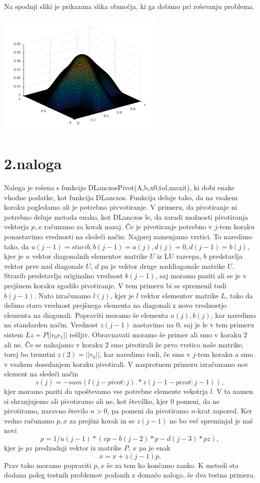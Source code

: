 \documentclass[11pt]{article} %
\begin{document}
Na spodnji sliki je prikazana slika območja, ki ga dobimo pri reševanju problema.

\includegraphics[width=0.6\textwidth]{slika1}

\section{2.naloga}

Naloga je rešena s funkcijo DLanczosPivot(A,b,x0,tol,maxit), ki dobi enake vhodne podatke, kot funkcija DLanczos. Funkcija deluje tako, da na vsakem koraku pogledamo ali je potrebno pivvotiranje. V primeru, da pivotiranje ni potrebno deluje metoda enako, kot DLanczos le, da zaradi možnosti pivotiranja vektorja $p,x$ računamo za korak nazaj. Če je pivotiranje potrebno v $j$-tem koraku ponastavimo vrednosti  na sledeči način:
Najprej zamenjamo vrstici. To naredimo tako, da
$u(j-1) = starib, b(j-1) = a(j), d(j) = 0, d(j-1)= b(j)$, kjer je $u$ vektor diagonalnih elementov matrike $U$ iz LU razcepa, $b$ predstavlja vektor prve nad diagonale $U$, $d$ pa je vektor druge naddiagonale matrike $U$. Strarib predstavlja originalno vrednost $b(j-1)$, saj moramo paziti ali se je v prejšnem koraku zgodilo pivotiranje. V tem primeru bi se spremenil tudi $b(j-1)$. Nato izračunamo $l(j)$, kjer je $l$ vektor elementov matrike $L$, tako da delimo staro vrednost prejšnega elementa na diagonali z novo vrednostjo elementa
na diagonali. Popraviti moramo še elementa $u(j),b(j)$, kar naredimo na standarden način. Vrednost $z(j-1)$ nastavimo na $0$, saj je le v tem primeru sistem $Lz=P||r_0e_1||$ rešljiv. Obravnavati moramo še primer ali smo v koraku $2$ ali ne. Če se nahajamo v koraku $2$ smo pivotirali že prvo vrstico naše matrike, torej bo trenutni $z(2)=||r_0||$, kar naredimo tudi, če smo v $j$-tem koraku a smo v vsakem dosedanjem koraku pivotirali. V nasprotnem primeru izračunamo nov element na sledeči način
$$z(j) = -sum(l(j-pivot:j).*z(j-1-pivot:j-1)),$$
kjer moramo paziti da upoštevamo vse potrebne elemente vekotrja $l$. V ta namen si shranjujemo ali pivotiramo ali ne, kot številko, kjer $0$ pomeni, da ne pivotiramo, naravno število $n>0$, pa pomeni da pivotiramo $n$-krat zapored. Ker vedno računamo $p,x$ za prejšni korak in se $z(j-1)$ ne bo več spreminjal je naš novi
$$p = 1/u(j-1)*(vp - b(j-2)*p-d(j-3)*pz),$$
 kjer je $pz$ predzadnji vektor iz matrike $P$, $x$ pa je enak
 $$x = x + z(j-1)p.$$
Prav tako moramo popraviti $p,x$ še za tem ko končamo zanko. K metodi sta dodana poleg testnih problemov podanih z domačo nalogo, še dva testna primera.
\end{document}
